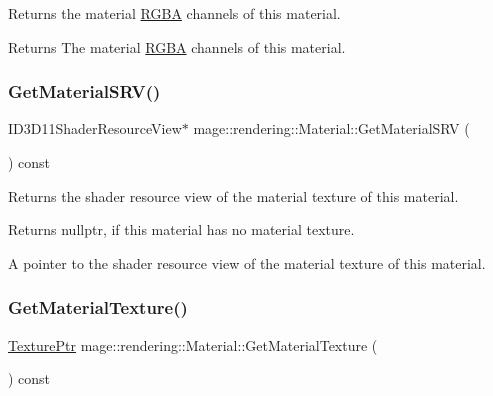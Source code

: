 Returns the material \hyperlink{structmage_1_1_r_g_b_a}{R\+G\+BA} channels of this material.

\begin{DoxyReturn}{Returns}
The material \hyperlink{structmage_1_1_r_g_b_a}{R\+G\+BA} channels of this material. 
\end{DoxyReturn}
\hypertarget{classmage_1_1rendering_1_1_material_ae1e1f712801dd1f16a695692df4f4f23}{}\label{classmage_1_1rendering_1_1_material_ae1e1f712801dd1f16a695692df4f4f23} 
\subsubsection{\texorpdfstring{Get\+Material\+S\+R\+V()}{GetMaterialSRV()}}
{\footnotesize\ttfamily I\+D3\+D11\+Shader\+Resource\+View$\ast$ mage\+::rendering\+::\+Material\+::\+Get\+Material\+S\+RV (\begin{DoxyParamCaption}{ }\end{DoxyParamCaption}) const\hspace{0.3cm}{\ttfamily [noexcept]}}

Returns the shader resource view of the material texture of this material.

\begin{DoxyReturn}{Returns}
{\ttfamily nullptr}, if this material has no material texture. 

A pointer to the shader resource view of the material texture of this material. 
\end{DoxyReturn}
\hypertarget{classmage_1_1rendering_1_1_material_aa396990a630c749a46a8a9fc88e80683}{}\label{classmage_1_1rendering_1_1_material_aa396990a630c749a46a8a9fc88e80683} 
\subsubsection{\texorpdfstring{Get\+Material\+Texture()}{GetMaterialTexture()}}
{\footnotesize\ttfamily \hyperlink{namespacemage_1_1rendering_a6f3ae54f825328465b0cdde0f0de4a36}{Texture\+Ptr} mage\+::rendering\+::\+Material\+::\+Get\+Material\+Texture (\begin{DoxyParamCaption}{ }\end{DoxyParamCaption}) const\hspace{0.3cm}{\ttfamily [noexcept]}}

